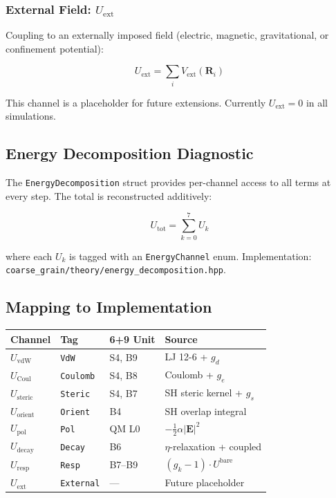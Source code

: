 \documentclass[11pt, a4paper, oneside]{article}
\newcommand{\file}[1]{\texttt{#1}}
\newcommand{\type}[1]{\texttt{#1}}
\begin{document}
\subsubsection{External Field:
  \texorpdfstring{$U_{\mathrm{ext}}$}{U\_ext}}

Coupling to an externally imposed field (electric, magnetic, gravitational,
or confinement potential):

\begin{equation}
U_{\mathrm{ext}} = \sum_i V_{\mathrm{ext}}(\mathbf{R}_i)
\label{eq:Uext}
\end{equation}

This channel is a placeholder for future extensions.  Currently
$U_{\mathrm{ext}} = 0$ in all simulations.

\subsection{Energy Decomposition Diagnostic}

The \type{EnergyDecomposition} struct provides per-channel access
to all terms at every step.  The total is reconstructed additively:

\begin{equation}
U_{\mathrm{tot}} = \sum_{k=0}^{7} U_k
\label{eq:Utot_sum}
\end{equation}

where each $U_k$ is tagged with an \type{EnergyChannel} enum.
Implementation: \file{coarse\_grain/theory/energy\_decomposition.hpp}.

\subsection{Mapping to Implementation}

\begin{center}
\small
\begin{tabularx}{\textwidth}{lllX}
\toprule
\textbf{Channel} & \textbf{Tag} & \textbf{6+9 Unit} & \textbf{Source} \\
\midrule
$U_{\mathrm{vdW}}$   & \type{VdW}      & S4, B9 & LJ 12-6 + $g_d$ \\
$U_{\mathrm{Coul}}$  & \type{Coulomb}  & S4, B8 & Coulomb + $g_e$ \\
$U_{\mathrm{steric}}$& \type{Steric}   & S4, B7 & SH steric kernel + $g_s$ \\
$U_{\mathrm{orient}}$& \type{Orient}   & B4     & SH overlap integral \\
$U_{\mathrm{pol}}$   & \type{Pol}      & QM L0  & $-\tfrac{1}{2}\alpha|\mathbf{E}|^2$ \\
$U_{\mathrm{decay}}$ & \type{Decay}    & B6     & $\eta$-relaxation + coupled \\
$U_{\mathrm{resp}}$  & \type{Resp}     & B7--B9 & $(g_k - 1)\cdot U^{\mathrm{bare}}$ \\
$U_{\mathrm{ext}}$   & \type{External} & —      & Future placeholder \\
\bottomrule
\end{tabularx}
\end{center}
\end{document}

